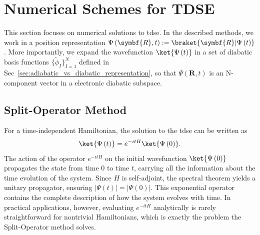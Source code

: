 \section{Numerical Schemes for TDSE}\label{sec:numerical_schemes_for_time_dependent_schrodinger_equation}
This section focuses on numerical solutions to \acrshort{tdse}. In the described methods, we work in a position representation $\Psi\left(\symbf{R},t\right):=\braket{\symbf{R}\vert\Psi\left(t\right)}$. More importantly, we expand the wavefunction $\ket{\Psi\left(t\right)}$ in a set of diabatic basis functions $\lbrace\tilde\phi_I\rbrace_{I=1}^N$ defined in Sec~\ref{sec:adiabatic_vs_diabatic_representation}, so that $\Psi\left(\symbf{R},t\right)$ is an N-component vector in a electronic diabatic subspace.
\subsection{Split-Operator Method}\label{sec:split_operator_method}
For a time-independent Hamiltonian, the solution to the \acrshort{tdse} can be written as
\begin{equation}\label{eq:tdse_propagator}
\ket{\Psi\left(t\right)}=e^{-i t H}\ket{\Psi\left(0\right)}.
\end{equation}
The action of the operator $e^{-i t H}$ on the initial wavefunction $\ket{\Psi\left(0\right)}$ propagates the state from time $0$ to time $t$, carrying all the information about the time evolution of the system. Since $H$ is self-adjoint, the spectral theorem yields a unitary propagator, ensuring $\lvert\Psi(t)\rvert=\lvert\Psi(0)\rvert$. This exponential operator contains the complete description of how the system evolves with time. In practical applications, however, evaluating $e^{-i t H}$ analytically is rarely straightforward for nontrivial Hamiltonians, which is exactly the problem the Split-Operator method solves.

